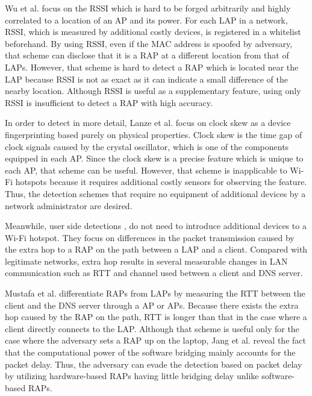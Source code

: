 \documentclass[paper]{ieice}
\begin{document}
Wu et al. \cite{prapd} focus on the RSSI which is hard to be forged arbitrarily and highly correlated to a location of an AP and its power.
For each LAP in a network, RSSI, which is measured by additional costly devices, is registered in a whitelist beforehand.
By using RSSI, even if the MAC address is spoofed by adversary, that scheme can disclose that it is a RAP at a different location from that of LAPs.
However, that scheme is hard to detect a RAP which is located near the LAP because RSSI is not as exact as it can indicate a small difference of the nearby location.
Although RSSI is useful as a supplementary feature, using only RSSI is insufficient to detect a RAP with high accuracy.

In order to detect in more detail, Lanze et al. \cite{clockskew} focus on clock skew as a device fingerprinting based purely on physical properties.
Clock skew is the time gap of clock signals caused by the crystal oscillator, which is one of the components equipped in each AP.
Since the clock skew is a precise feature which is unique to each AP, that scheme can be useful.
However, that scheme is inapplicable to Wi-Fi hotspots because it requires additional costly sensors for observing the feature.
Thus, the detection schemes that require no equipment of additional devices by a network administrator are desired.

Meanwhile, user side detections \cite{rtt}, \cite{previous} do not need to introduce additional devices to a Wi-Fi hotspot.
They focus on differences in the packet transmission caused by the extra hop to a RAP on the path between a LAP and a client.
Compared with legitimate networks, extra hop results in several measurable changes in LAN communication such as RTT and channel used between a client and DNS server.

Mustafa et al. \cite{rtt} differentiate RAPs from LAPs by measuring the RTT between the client and the DNS server through a AP or APs.
Because there exists the extra hop caused by the RAP on the path, RTT is longer than that in the case where a client directly connects to the LAP.
Although that scheme is useful only for the case where the adversary sets a RAP up on the laptop, Jang et al. \cite{previous} reveal the fact that the computational power of the software bridging mainly accounts for the packet delay.
Thus, the adversary can evade the detection based on packet delay by utilizing hardware-based RAPs having little bridging delay unlike software-based RAPs.
\end{document}
